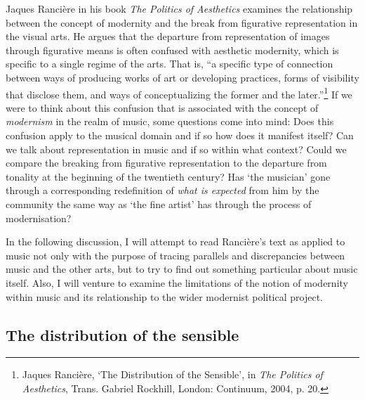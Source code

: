 Jaques Ranci\`{e}re in his book \emph{The Politics of Aesthetics} examines the relationship between the concept of modernity and the break from figurative representation in the visual arts. He argues that the departure from representation of images through figurative means is often confused with aesthetic modernity, which is specific to a single regime of the arts. That is, ``a specific type of connection between ways of producing works of art or developing practices, forms of visibility that disclose them, and ways of conceptualizing the former and the later.''\footnote{Jaques Ranci\`{e}re, `The Distribution of the Sensible', in \emph{The Politics of Aesthetics}, Trans. Gabriel Rockhill, London: Continuum, 2004, p. 20.} If we were to think about this confusion that is associated with the concept of \emph{modernism} in the realm of music, some questions come into mind: Does this confusion apply to the musical domain and if so how does it manifest itself? Can we talk about representation in music and if so within what context? Could we compare the breaking from figurative representation to the departure from tonality at the beginning of the twentieth century? Has `the musician' gone through a corresponding redefinition of \emph{what is expected} from him by the community the same way as `the fine artist' has through the process of modernisation?

In the following discussion, I will attempt to read Ranci\`{e}re's text as applied to music not only with the purpose of tracing parallels and discrepancies between music and the other arts, but to try to find out something particular about music itself. Also, I will venture to examine the limitations of the notion of modernity within music and its relationship to the wider modernist political project.

\subsection{The distribution of the sensible}


